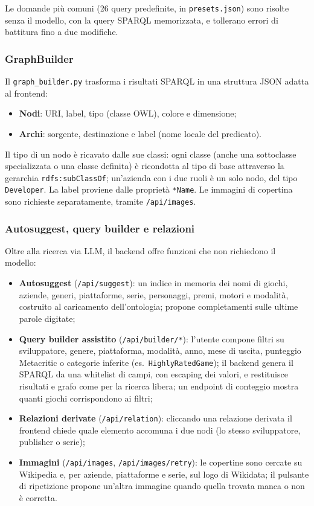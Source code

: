 Le domande pi\`u comuni (26 query predefinite, in \texttt{presets.json}) sono risolte senza il modello,
con la query SPARQL memorizzata, e tollerano errori di battitura fino a due modifiche.

\subsubsection{GraphBuilder}

Il \texttt{graph\_builder.py} trasforma i risultati SPARQL in una struttura JSON adatta al frontend:
\begin{itemize}[nosep]
  \item \textbf{Nodi}: URI, label, tipo (classe OWL), colore e dimensione;
  \item \textbf{Archi}: sorgente, destinazione e label (nome locale del predicato).
\end{itemize}

Il tipo di un nodo \`e ricavato dalle sue classi: ogni classe (anche una sottoclasse specializzata o una
classe definita) \`e ricondotta al tipo di base attraverso la gerarchia \texttt{rdfs:subClassOf}; un'azienda
con i due ruoli \`e un solo nodo, del tipo \texttt{Developer}. La label proviene dalle propriet\`a
\texttt{*Name}. Le immagini di copertina sono richieste separatamente, tramite \texttt{/api/images}.

\subsubsection{Autosuggest, query builder e relazioni}

Oltre alla ricerca via LLM, il backend offre funzioni che non richiedono il modello:
\begin{itemize}[nosep]
  \item \textbf{Autosuggest} (\texttt{/api/suggest}): un indice in memoria dei nomi di giochi, aziende,
    generi, piattaforme, serie, personaggi, premi, motori e modalit\`a, costruito al caricamento
    dell'ontologia; propone completamenti sulle ultime parole digitate;
  \item \textbf{Query builder assistito} (\texttt{/api/builder/*}): l'utente compone filtri su sviluppatore,
    genere, piattaforma, modalit\`a, anno, mese di uscita, punteggio Metacritic o categorie inferite (es.\
    \texttt{HighlyRatedGame}); il backend genera il SPARQL da una whitelist di campi, con escaping dei valori,
    e restituisce risultati e grafo come per la ricerca libera; un endpoint di conteggio mostra quanti giochi
    corrispondono ai filtri;
  \item \textbf{Relazioni derivate} (\texttt{/api/relation}): cliccando una relazione derivata il frontend
    chiede quale elemento accomuna i due nodi (lo stesso sviluppatore, publisher o serie);
  \item \textbf{Immagini} (\texttt{/api/images}, \texttt{/api/images/\allowbreak retry}): le copertine sono cercate su
    Wikipedia e, per aziende, piattaforme e serie, sul logo di Wikidata; il pulsante di ripetizione propone
    un'altra immagine quando quella trovata manca o non \`e corretta.
\end{itemize}

